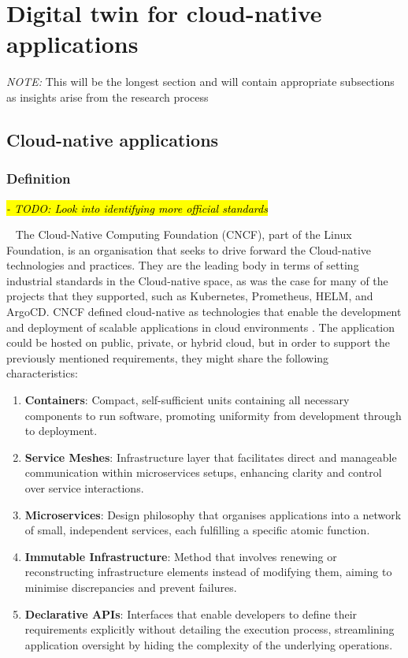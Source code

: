 \section{Digital twin for cloud-native applications}

\textit{NOTE:} This will be the longest section and will contain appropriate subsections as insights arise from the research process \\

\subsection{Cloud-native applications}
\subsubsection{Definition}

\hl{\textit{- TODO: Look into identifying more official standards}}

\par{~}
The Cloud-Native Computing Foundation (CNCF), part of the Linux Foundation, is an organisation that seeks to drive forward the Cloud-native technologies and practices. They are the leading body in terms of setting industrial standards in the Cloud-native space, as was the case for many of the projects that they supported, such as Kubernetes, Prometheus, HELM, and ArgoCD. CNCF defined cloud-native as technologies that enable the development and deployment of scalable applications in cloud environments \cite{cloud_native_computing_foundation_who_nodate}. The application could be hosted on public, private, or hybrid cloud, but in order to support the previously mentioned requirements, they might share the following characteristics:

\begin{enumerate}
\item
  \textbf{Containers}: Compact, self-sufficient units containing all necessary components to run software, promoting uniformity from development through to deployment.
\item
  \textbf{Service Meshes}: Infrastructure layer that facilitates direct and manageable communication within microservices setups, enhancing clarity and control over service interactions.
\item
  \textbf{Microservices}: Design philosophy that organises applications into a network of small, independent services, each fulfilling a specific atomic function.
\item
  \textbf{Immutable Infrastructure}: Method that involves renewing or reconstructing infrastructure elements instead of modifying them, aiming to minimise discrepancies and prevent failures.
\item
  \textbf{Declarative APIs}: Interfaces that enable developers to define their requirements explicitly without detailing the execution process, streamlining application oversight by hiding the complexity of the underlying operations.
\end{enumerate}

